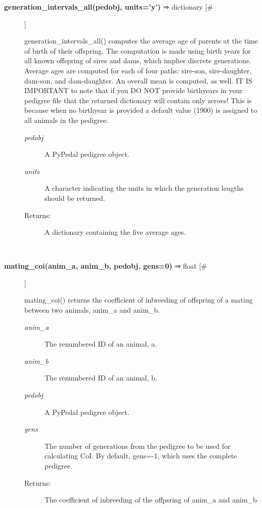 \begin{description}
\item[\textbf{generation\_intervals\_all(pedobj, units='y')} ⇒ dictionary [\#]
]
\par generation\_intervals\_all() computes the average age of parents at the time of
birth of their offspring.  The computation is made using birth years for all
known offspring of sires and dams, which implies discrete generations.  Average
ages are computed for each of four paths: sire-son, sire-daughter, dam-son, and
dam-daughter.  An overall mean is computed, as well. IT IS IMPORTANT to note that
if you DO NOT provide birthyears in your pedigree file that the returned dictionary
will contain only zeroes!  This is because when no birthyear is provided a default
value (1900) is assigned to all animals in the pedigree.
\begin{description}
\item[\textit{pedobj}
]
A PyPedal pedigree object.
\item[\textit{units}
]
A character indicating the units in which the generation lengths should be returned.
\item[Returns:
]
A dictionary containing the five average ages.
\end{description}\\

\item[\textbf{mating\_coi(anim\_a, anim\_b, pedobj, gens=0)} ⇒ float [\#]
]
\par mating\_coi() returns the coefficient of inbreeding of offspring of a
mating between two animals, anim\_a and anim\_b.
\begin{description}
\item[\textit{anim\_a}
]
The renumbered ID of an animal, a.
\item[\textit{anim\_b}
]
The renumbered ID of an animal, b.
\item[\textit{pedobj}
]
A PyPedal pedigree object.
\item[\textit{gens}
]
The number of generations from the pedigree to be used for calculating CoI.  By default, gens=-1, which uses the complete pedigree.
\item[Returns:
]
The coefficient of inbreeding of the offpsring of anim\_a and anim\_b
\end{description}\\


\end{description}
